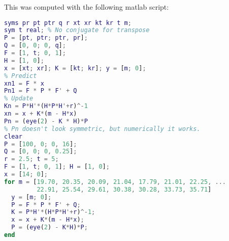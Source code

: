 \documentclass[11pt]{article}
\begin{document}
This was computed with the following matlab script:
\begin{lstlisting}[language=matlab]
syms pr pt ptr q r xt xr kt kr t m;
sym t real; % No conjugate for transpose
P = [pt, ptr; ptr, pr];
Q = [0, 0; 0, q];
F = [1, t; 0, 1];
H = [1, 0];
x = [xt; xr]; K = [kt; kr]; y = [m; 0];
% Predict
xn1 = F * x
Pn1 = F * P * F' + Q
% Update
Kn = P*H'*(H*P*H'+r)^-1
xn = x + K*(m - H*x)
Pn = (eye(2) - K * H)*P
% Pn doesn't look symmetric, but numerically it works.
clear
P = [100, 0; 0, 16];
Q = [0, 0; 0, 0.25];
r = 2.5; t = 5;
F = [1, t; 0, 1]; H = [1, 0];
x = [14; 0];
for m = [19.70, 20.35, 20.09, 21.04, 17.79, 21.01, 22.25, ...
         22.91, 25.54, 29.61, 30.38, 30.28, 33.73, 35.71]
  y = [m; 0];
  P = F * P * F' + Q;
  K = P*H'*(H*P*H'+r)^-1;
  x = x + K*(m - H*x);
  P = (eye(2) - K*H)*P;
end
\end{lstlisting}

\end{document}
